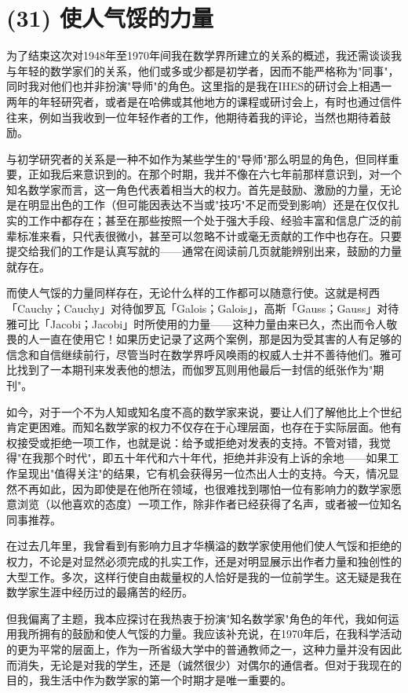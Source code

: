 \section{(31) 使人气馁的力量}

为了结束这次对1948年至1970年间我在数学界所建立的关系的概述，我还需谈谈我与年轻的数学家们的关系，他们或多或少都是初学者，因而不能严格称为"同事"，同时我对他们也并非扮演"导师"的角色。这里指的是我在IHES的研讨会上相遇一两年的年轻研究者，或者是在哈佛或其他地方的课程或研讨会上，有时也通过信件往来，例如当我收到一位年轻作者的工作，他期待着我的评论，当然也期待着鼓励。

与初学研究者的关系是一种不如作为某些学生的"导师"那么明显的角色，但同样重要，正如我后来意识到的。在那个时期，我并不像在六七年前那样意识到，对一个知名数学家而言，这一角色代表着相当大的权力。首先是鼓励、激励的力量，无论是在明显出色的工作（但可能因表达不当或"技巧"不足而受到影响）还是在仅仅扎实的工作中都存在；甚至在那些按照一个处于强大手段、经验丰富和信息广泛的前辈标准来看，只代表很微小，甚至可以忽略不计或毫无贡献的工作中也存在。只要提交给我们的工作是认真写就的——通常在阅读前几页就能辨别出来，鼓励的力量就存在。

而使人气馁的力量同样存在，无论什么样的工作都可以随意行使。这就是柯西「Cauchy；Cauchy」对待伽罗瓦「Galois；Galois」，高斯「Gauss；Gauss」对待雅可比「Jacobi；Jacobi」时所使用的力量——这种力量由来已久，杰出而令人敬畏的人一直在使用它！如果历史记录了这两个案例，那是因为受其害的人有足够的信念和自信继续前行，尽管当时在数学界呼风唤雨的权威人士并不善待他们。雅可比找到了一本期刊来发表他的想法，而伽罗瓦则用他最后一封信的纸张作为"期刊"。

如今，对于一个不为人知或知名度不高的数学家来说，要让人们了解他比上个世纪肯定更困难。而知名数学家的权力不仅存在于心理层面，也存在于实际层面。他有权接受或拒绝一项工作，也就是说：给予或拒绝对发表的支持。不管对错，我觉得"在我那个时代"，即五十年代和六十年代，拒绝并非没有上诉的余地——如果工作呈现出"值得关注"的结果，它有机会获得另一位杰出人士的支持。今天，情况显然不再如此，因为即使是在他所在领域，也很难找到哪怕一位有影响力的数学家愿意浏览（以他喜欢的态度）一项工作，除非作者已经获得了名声，或者被一位知名同事推荐。

在过去几年里，我曾看到有影响力且才华横溢的数学家使用他们使人气馁和拒绝的权力，不论是对显然必须完成的扎实工作，还是对明显展示出作者力量和独创性的大型工作。多次，这样行使自由裁量权的人恰好是我的一位前学生。这无疑是我在数学家生涯中经历过的最痛苦的经历。

但我偏离了主题，我本应探讨在我热衷于扮演"知名数学家"角色的年代，我如何运用我所拥有的鼓励和使人气馁的力量。我应该补充说，在1970年后，在我科学活动的更为平常的层面上，作为一所省级大学中的普通教师之一，这种力量并没有因此而消失，无论是对我的学生，还是（诚然很少）对偶尔的通信者。但对于我现在的目的，我生活中作为数学家的第一个时期才是唯一重要的。

